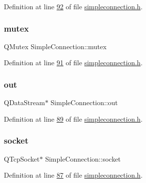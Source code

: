 Definition at line \hyperlink{a00008_source_l00092}{92} of file \hyperlink{a00008_source}{simpleconnection.\+h}.

\mbox{\label{a00125_acb6f6147828cec46cc69459f0de82cb0}} 
\subsubsection{\texorpdfstring{mutex}{mutex}}
{\footnotesize\ttfamily Q\+Mutex Simple\+Connection\+::mutex\hspace{0.3cm}{\ttfamily [protected]}}



Definition at line \hyperlink{a00008_source_l00091}{91} of file \hyperlink{a00008_source}{simpleconnection.\+h}.

\mbox{\label{a00125_a8db5848b9d5d30739d609feb973b86d2}} 
\subsubsection{\texorpdfstring{out}{out}}
{\footnotesize\ttfamily Q\+Data\+Stream$\ast$ Simple\+Connection\+::out\hspace{0.3cm}{\ttfamily [protected]}}



Definition at line \hyperlink{a00008_source_l00089}{89} of file \hyperlink{a00008_source}{simpleconnection.\+h}.

\mbox{\label{a00125_aee87a3e761deb38bce08ebb30cd73362}} 
\subsubsection{\texorpdfstring{socket}{socket}}
{\footnotesize\ttfamily Q\+Tcp\+Socket$\ast$ Simple\+Connection\+::socket\hspace{0.3cm}{\ttfamily [protected]}}



Definition at line \hyperlink{a00008_source_l00087}{87} of file \hyperlink{a00008_source}{simpleconnection.\+h}.

